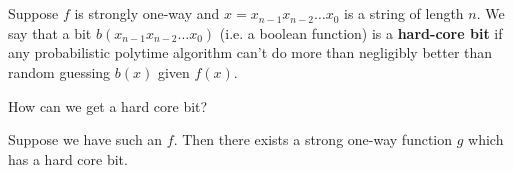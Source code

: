 
\section*{}

\begin{definition}
	Suppose $f$ is strongly one-way and $x=x_{n-1}x_{n-2}\dots x_0$ is a string of length $n$.  We say that a bit $b(x_{n-1}x_{n-2}\dots x_0)$ (i.e. a boolean function) is a \textbf{hard-core bit} if any probabilistic polytime algorithm can't do more than negligibly better than random guessing $b(x)$ given $f(x)$.
\end{definition}

How can we get a hard core bit?  

\begin{theorem}
Suppose we have such an $f$.  Then there exists a strong one-way function $g$ which has a hard core bit.
\end{theorem}


